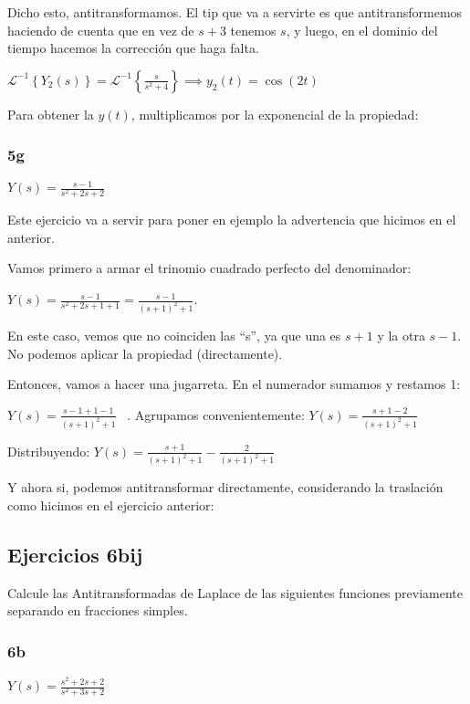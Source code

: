 \documentclass[11pt]{article}
\def\sen{\mathrm{sen}}
\newcommand{\ilapl}[1]{\mathscr{L}^{-1} \left\lbrace {#1} \right\rbrace}
\begin{document}
	Dicho esto, antitransformamos. El tip que va a servirte es que antitransformemos haciendo de cuenta que en vez de $s+3$ tenemos $s$, y luego, en el dominio del tiempo hacemos la corrección que haga falta.
	
	$\displaystyle \ilapl{Y_{2}(s)}=\ilapl{\frac{s}{s^{2}+4}} \implies y_{2}(t)=\cos(2t)$
	
	Para obtener la $y(t)$, multiplicamos por la exponencial de la propiedad: 
	
	\subsubsection{5g}
	$\displaystyle Y(s)=\frac{s-1}{s^{2}+2s+2}$
	
	Este ejercicio va a servir para poner en ejemplo la advertencia que hicimos en el anterior.
	
	Vamos primero a armar el trinomio cuadrado perfecto del denominador:
	
	$\displaystyle Y(s)=\frac{s-1}{s^{2}+2s+1+1}=\frac{s-1}{(s+1)^{2}+1}$.
	
	En este caso, vemos que no coinciden las ``s'', ya que una es $s+1$ y la otra $s-1$. No podemos aplicar la propiedad (directamente).
	
	Entonces, vamos a hacer una jugarreta. En el numerador sumamos y restamos 1:
	
	$\displaystyle Y(s)=\frac{s-1+1-1}{(s+1)^{2}+1} \;\;\;$. Agrupamos convenientemente: $\displaystyle Y(s)=\frac{s+1-2}{(s+1)^{2}+1}$
	
	Distribuyendo: $\displaystyle Y(s)=\frac{s+1}{(s+1)^2+1}-\frac{2}{(s+1)^2+1}$
	
	Y ahora si, podemos antitransformar directamente, considerando la traslación como hicimos en el ejercicio anterior:
	
	\fcolorbox{black}{yellow}{$y(t)=\cos(t)e^{-t}-2\sen(t)e^{-t}$}
	
	\subsection{Ejercicios 6bij}
	Calcule las Antitransformadas de Laplace de las siguientes funciones previamente separando en fracciones simples.
	
	\subsubsection{6b}
	$\displaystyle Y(s)=\frac{s^{2}+2s+2}{s^{2}+3s+2}$
\end{document}
